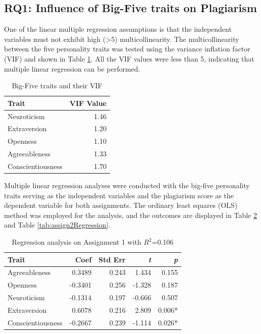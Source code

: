 \subsection{RQ1: Influence of Big-Five traits on Plagiarism}

One of the linear multiple regression assumptions is that the independent variables must not exhibit high (>5) multicollinearity. The multicollinearity between the five personality traits was tested using the variance inflation factor (VIF) and shown in Table \ref{tab:VIF}. All the VIF values were less than 5, indicating that multiple linear regression can be performed. 

\begin{table}[h]
  \centering
  \caption{Big-Five traits and their VIF\label{tab:VIF}}
    \vspace{-12pt}
  \begin{tabular}{p{2cm}r}
    \toprule
    Trait & VIF Value \\\midrule
    Neuroticism & 1.46 \\
    Extraversion & 1.20 \\
    Openness & 1.10\\
    Agreeableness & 1.33 \\ 
    Conscientiousness & 1.70  \\\bottomrule
  \end{tabular}\vspace{-4pt}
\end{table}

Multiple linear regression analyses were conducted with the big-five personality traits serving as the independent variables and the plagiarism score as the dependent variable for both assignments. The ordinary least squares (OLS) method was employed for the analysis, and the outcomes are displayed in Table \ref{tab:assign1Regression} and Table \ref{tab:assign2Regression}.

\begin{table}[h]
  \centering
  \caption{Regression analysis on Assignment 1 with $R^2$=0.106\\\label{tab:assign1Regression}}
    \vspace{-12pt}
  \begin{tabular}{p{2.5cm}rrrr}
    \toprule
    Trait & Coef & Std Err & \textit{t} & \textit{p}\\\midrule
    Agreeableness & 0.3489 & 0.243 & 1.434 & 0.155 \\
    Openness & -0.3401 & 0.256 & -1.328 & 0.187 \\
    Neuroticism & -0.1314 & 0.197 & -0.666 & 0.507 \\
    Extraversion & 0.6078 & 0.216 & 2.809 & 0.006* \\
    Conscientiousness & -0.2667 & 0.239 & -1.114 & 0.026* \\\bottomrule
  \end{tabular}\vspace{-4pt}
\end{table}

